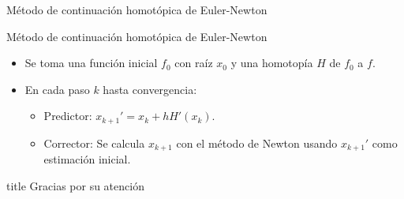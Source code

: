 \documentclass[a4paper,10pt]{beamer}
\begin{document}
\begin{frame}{Método de continuación homotópica de Euler-Newton}
\begin{itemize}
\begin{figure}[H]
		\end{figure}
	\end{itemize}
\end{frame}

\begin{frame}{Método de continuación homotópica de Euler-Newton}
	\begin{itemize}
		\item Se toma una función inicial $f_0$ con raíz $x_0$ y una homotopía $H$ de $f_0$ a $f$.
		\item En cada paso $k$ hasta convergencia:
		\begin{itemize}
			\item Predictor: $x_{k+1}' = x_k + h H'(x_k)$.
			\item Corrector: Se calcula $x_{k+1}$ con el método de Newton usando $x_{k+1}'$ como estimación inicial.
		\end{itemize}
	\end{itemize}
	
\end{frame}

\appendix

\begin{frame}
	\vfill
	\centering
	\begin{beamercolorbox}[sep=8pt,center,shadow=true,rounded=true]{title}
		Gracias por su atención\par%
	\end{beamercolorbox}
	\vfill
\end{frame}
\end{document}
